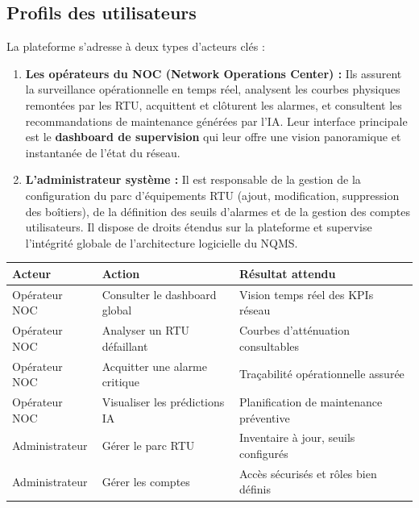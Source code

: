 \documentclass[11pt,a4paper]{article}
\begin{document}
\subsection{Profils des utilisateurs}

La plateforme s'adresse à deux types d'acteurs clés :

\begin{enumerate}
    \item \textbf{Les opérateurs du NOC (Network Operations Center) :} Ils assurent la surveillance opérationnelle en temps réel, analysent les courbes physiques remontées par les RTU, acquittent et clôturent les alarmes, et consultent les recommandations de maintenance générées par l'IA. Leur interface principale est le \textbf{dashboard de supervision} qui leur offre une vision panoramique et instantanée de l'état du réseau.

    \item \textbf{L'administrateur système :} Il est responsable de la gestion de la configuration du parc d'équipements RTU (ajout, modification, suppression des boîtiers), de la définition des seuils d'alarmes et de la gestion des comptes utilisateurs. Il dispose de droits étendus sur la plateforme et supervise l'intégrité globale de l'architecture logicielle du NQMS.
\end{enumerate}

\begin{tcolorbox}[colback=bg-slate, colframe=teal-accent, title=Résumé des cas d'utilisation principaux]
    \small
    \begin{tabular}{lll}
        \toprule
        \textbf{Acteur} & \textbf{Action} & \textbf{Résultat attendu} \\
        \midrule
        Opérateur NOC & Consulter le dashboard global & Vision temps réel des KPIs réseau \\
        Opérateur NOC & Analyser un RTU défaillant & Courbes d'atténuation consultables \\
        Opérateur NOC & Acquitter une alarme critique & Traçabilité opérationnelle assurée \\
        Opérateur NOC & Visualiser les prédictions IA & Planification de maintenance préventive \\
        Administrateur & Gérer le parc RTU & Inventaire à jour, seuils configurés \\
        Administrateur & Gérer les comptes & Accès sécurisés et rôles bien définis \\
        \bottomrule
    \end{tabular}
\end{tcolorbox}
\end{document}
